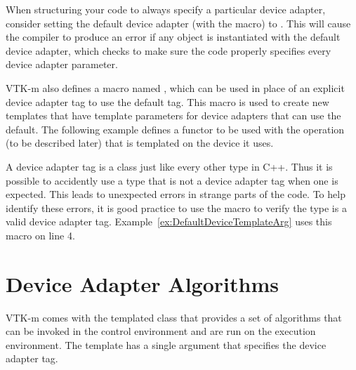 When structuring your code to always specify a particular device adapter,
consider setting the default device adapter (with the
 macro) to
. This will cause the compiler to
produce an error if any object is instantiated with the default device
adapter, which checks to make sure the code properly specifies every device
adapter parameter.

VTK-m also defines a macro named
, which can be used in place
of an explicit device adapter tag to use the default tag. This macro is
used to create new templates that have template parameters for device
adapters that can use the default. The following example defines a functor
to be used with the  operation (to be described later)
that is templated on the device it uses.


\begin{commonerrors}
  A device adapter tag is a class just like every other type in C++. Thus
  it is possible to accidently use a type that is not a device adapter tag
  when one is expected. This leads to unexpected errors in strange parts of
  the code. To help identify these errors, it is good practice to use the
   macro to verify the type is a
  valid device adapter tag. Example~\ref{ex:DefaultDeviceTemplateArg} uses
  this macro on line 4.
\end{commonerrors}



\section{Device Adapter Algorithms}
\label{sec:DeviceAdapterAlgorithms}


VTK-m comes with the templated class  that
provides a set of algorithms that can be invoked in the control environment
and are run on the execution environment. The template has a single
argument that specifies the device adapter tag.


